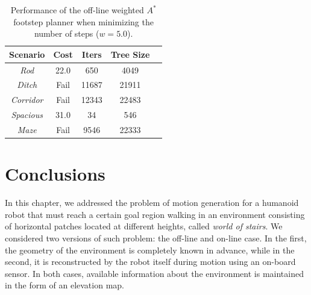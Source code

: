 \begin{table}
    \centering
    \begin{tabular}{*{5}{c}}
        Scenario & Cost & Iters & Tree Size \\
        \hline
        \textit{Rod} & 22.0 & 650 & 4049 \\
        \textit{Ditch} & Fail & 11687 & 21911 \\
        \textit{Corridor} & Fail & 12343 & 22483 \\
        \textit{Spacious} & 31.0 & 34 & 546 \\
        \textit{Maze} & Fail & 9546 & 22333
    \end{tabular}
    \caption{Performance of the off-line weighted $A^\ast$ footstep planner when minimizing the number of steps ($w=5.0$).}
    \label{tab:benchmark-wastar-w5}
\end{table}


\section{Conclusions}
\label{sec:WoS:Conclusions}
In this chapter, we addressed the problem of motion generation for a humanoid robot that must reach a certain goal region walking in an environment consisting of horizontal patches located at different heights, called \textit{world of stairs}.
We considered two versions of such problem: the off-line and on-line case. 
In the first, the geometry of the environment is completely known in advance, while in the second, it is reconstructed by the robot itself during motion using an on-board sensor. In both cases, available information about the environment is maintained in the form of an elevation map. 

